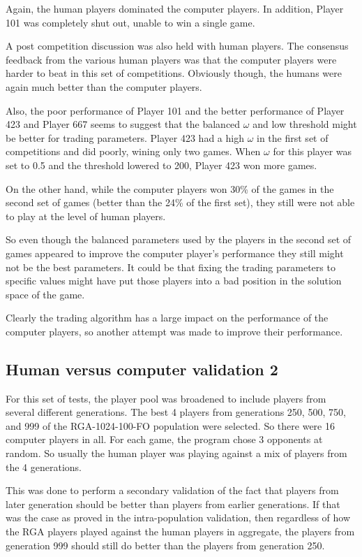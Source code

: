 Again, the human players dominated the computer players. In addition, Player
101 was completely shut out, unable to win a single game. 

A post competition discussion was also held with human players. The consensus 
feedback from the various human players was that the computer players were 
harder to beat in this set of competitions. Obviously though, the humans were 
again much better than the computer players. 

Also, the poor performance of Player 101 and the better performance of Player
423 and Player 667 seems to suggest that the balanced \(\omega\) and low 
threshold might be better for trading parameters. Player 423 had a high 
\(\omega\) in the first set of competitions and did poorly, wining only two 
games. When \(\omega\) for this player was set to 0.5 and the threshold lowered
to 200, Player 423 won more games. 

On the other hand, while the computer players won 30\% of the games in the
second set of games (better than the 24\% of the first set), they still were not
able to play at the level of human players. 

So even though the balanced parameters used by the players in the second set of
games appeared to improve the computer player's performance they still might not
be the best parameters. It could be that fixing the trading parameters to
specific values might have put those players into a bad position in the solution
space of the game.

Clearly the trading algorithm has a large impact on the performance of the 
computer players, so another attempt was made to improve their performance.

\subsection{Human versus computer validation 2} \label{6_humanVRGA2}

For this set of tests, the player pool was broadened to include players from
several different generations. The best 4 players from generations 250, 500,
750, and 999 of the RGA-1024-100-FO population were selected. So there were 16
computer players in all. For each game, the program chose 3 opponents at
random. So usually the human player was playing against a mix of players from
the 4 generations.

This was done to perform a secondary validation of the fact that players from
later generation should be better than players from earlier generations. If that
was the case as proved in the intra-population validation, then regardless of
how the RGA players played against the human players in aggregate, the players
from generation 999 should still do better than the players from generation 250.



